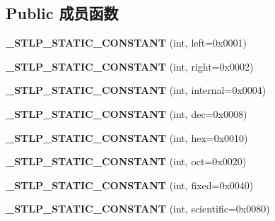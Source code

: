 \subsection*{Public 成员函数}
\begin{DoxyCompactItemize}
\item 
\mbox{\label{classios__base_ab0186d236f8f309940513689ae0ba9be}} 
{\bfseries \+\_\+\+S\+T\+L\+P\+\_\+\+S\+T\+A\+T\+I\+C\+\_\+\+C\+O\+N\+S\+T\+A\+NT} (int, left=0x0001)
\item 
\mbox{\label{classios__base_ae11c9b0eea8e4065b0c5da838af568cb}} 
{\bfseries \+\_\+\+S\+T\+L\+P\+\_\+\+S\+T\+A\+T\+I\+C\+\_\+\+C\+O\+N\+S\+T\+A\+NT} (int, right=0x0002)
\item 
\mbox{\label{classios__base_a33475c8d70f4cc917b0cfc4bd4b86fbf}} 
{\bfseries \+\_\+\+S\+T\+L\+P\+\_\+\+S\+T\+A\+T\+I\+C\+\_\+\+C\+O\+N\+S\+T\+A\+NT} (int, internal=0x0004)
\item 
\mbox{\label{classios__base_add5f762731f8c6f92716604f0913ed7d}} 
{\bfseries \+\_\+\+S\+T\+L\+P\+\_\+\+S\+T\+A\+T\+I\+C\+\_\+\+C\+O\+N\+S\+T\+A\+NT} (int, dec=0x0008)
\item 
\mbox{\label{classios__base_adbb9c573162729432a5a7d2186bc85af}} 
{\bfseries \+\_\+\+S\+T\+L\+P\+\_\+\+S\+T\+A\+T\+I\+C\+\_\+\+C\+O\+N\+S\+T\+A\+NT} (int, hex=0x0010)
\item 
\mbox{\label{classios__base_ad55a974d20505bc6c8edbb168afcc6cd}} 
{\bfseries \+\_\+\+S\+T\+L\+P\+\_\+\+S\+T\+A\+T\+I\+C\+\_\+\+C\+O\+N\+S\+T\+A\+NT} (int, oct=0x0020)
\item 
\mbox{\label{classios__base_a5ef2ecb37ef11c8da8e13913dad46299}} 
{\bfseries \+\_\+\+S\+T\+L\+P\+\_\+\+S\+T\+A\+T\+I\+C\+\_\+\+C\+O\+N\+S\+T\+A\+NT} (int, fixed=0x0040)
\item 
\mbox{\label{classios__base_ac522609204de44b5ff5b9448fb866f9e}} 
{\bfseries \+\_\+\+S\+T\+L\+P\+\_\+\+S\+T\+A\+T\+I\+C\+\_\+\+C\+O\+N\+S\+T\+A\+NT} (int, scientific=0x0080)
\item 
\mbox{\label{classios__base_a0bf7c3c8b4d86fe610eb8458523a0c88}} 

\end{DoxyCompactItemize}
